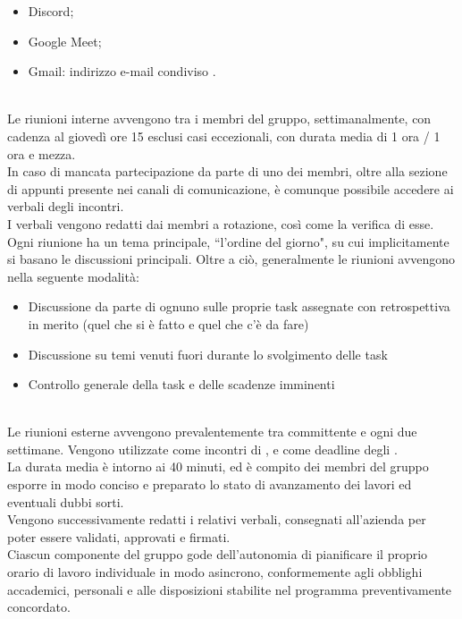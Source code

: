 \begin{itemize}
  \item Discord;
  \item Google Meet;
  \item Gmail: indirizzo e-mail condiviso
      \href{nan1fyteam.unipd@gmail.com}{\color{black}{nan1fyteam.unipd@gmail.com}}.
\end{itemize}
\\
Le riunioni interne avvengono tra i membri del gruppo, settimanalmente, con cadenza al giovedì ore 15 esclusi casi eccezionali, con durata media di 1 ora / 1 ora e mezza.\\
In caso di mancata partecipazione da parte di uno dei membri, oltre alla sezione di appunti presente nei canali di comunicazione, è comunque possibile accedere ai verbali degli incontri.\\
I verbali vengono redatti dai membri a rotazione, così come la verifica di esse.\\
Ogni riunione ha un tema principale, ``l'ordine del giorno", su cui implicitamente si basano le discussioni principali.
Oltre a ciò, generalmente le riunioni avvengono nella seguente modalità:
\begin{itemize}
  \item{Discussione da parte di ognuno sulle proprie task assegnate con retrospettiva in merito (quel che si è fatto e quel che c'è da fare)}
  \item{Discussione su temi venuti fuori durante lo svolgimento delle task}
  \item{Controllo generale della task  e delle scadenze imminenti}
\end{itemize}
\\
Le riunioni esterne avvengono prevalentemente tra committente e  ogni due
settimane. Vengono utilizzate come incontri di , e come deadline degli .\\
La durata media è intorno ai 40 minuti, ed è compito dei membri del gruppo esporre in modo conciso e preparato lo stato di avanzamento dei lavori ed eventuali dubbi sorti.\\
Vengono successivamente redatti i relativi verbali, consegnati all'azienda per poter essere validati, approvati e firmati.
\\
Ciascun componente del gruppo gode dell'autonomia di pianificare il proprio orario di lavoro individuale in modo asincrono, conformemente agli obblighi accademici, personali e alle disposizioni stabilite nel programma preventivamente concordato.
